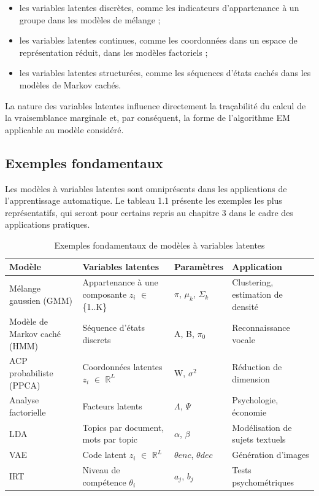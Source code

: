 \begin{itemize}
\item les variables latentes discrètes, comme les indicateurs d'appartenance à un groupe dans les modèles de mélange ;
\item les variables latentes continues, comme les coordonnées dans un espace de représentation réduit, dans les modèles factoriels ;
\item les variables latentes structurées, comme les séquences d'états cachés dans les modèles de Markov cachés.
\end{itemize}
La nature des variables latentes influence directement la traçabilité du calcul de la vraisemblance marginale et, par conséquent, la forme de l'algorithme EM applicable au modèle considéré.

\subsection{Exemples fondamentaux}
Les modèles à variables latentes sont omniprésents dans les applications de l'apprentissage automatique. Le tableau 1.1 présente les exemples les plus représentatifs, qui seront pour certains repris au chapitre 3 dans le cadre des applications pratiques.

\begin{table}[H]
\centering
\small
\setlength{\tabcolsep}{0.14cm}
\begin{tabular}{|p{3.54cm}|p{3.54cm}|p{3.54cm}|p{3.54cm}|}
\hline
\textbf{Modèle} & \textbf{Variables latentes} & \textbf{Paramètres} & \textbf{Application} \\
\hline
Mélange gaussien (GMM) & Appartenance à une composante $z_{i}$ $\in $ \{1..K\} & $\pi $, $\mu _{k}$, $\Sigma _{k}$ & Clustering, estimation de densité \\
\hline
Modèle de Markov caché (HMM) & Séquence d'états discrets & A, B, $\pi _{0}$ & Reconnaissance vocale \\
\hline
ACP probabiliste (PPCA) & Coordonnées latentes $z_{i}$ $\in $ $\mathbb{R}^{L}$ & W, $\sigma ^{2}$ & Réduction de dimension \\
\hline
Analyse factorielle & Facteurs latents & $\Lambda $, $\Psi $ & Psychologie, économie \\
\hline
LDA & Topics par document, mots par topic & $\alpha $, $\beta $ & Modélisation de sujets textuels \\
\hline
VAE & Code latent $z_{i}$ $\in $ $\mathbb{R}^{L}$ & $\theta enc$, $\theta dec$ & Génération d'images \\
\hline
IRT & Niveau de compétence $\theta _{i}$ & $a_{j}$, $b_{j}$ & Tests psychométriques \\
\hline
\end{tabular}
\caption{Exemples fondamentaux de modèles à variables latentes}
\label{tab:1_1}
\end{table}
